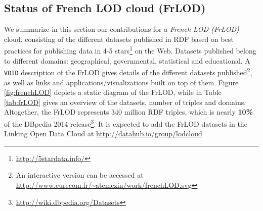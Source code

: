 \subsection{Status of French LOD cloud (FrLOD) }
\label{sec:frenchCloud}
We summarize in this section our contributions for a \textit{French LOD (FrLOD)} cloud, consisting of the different datasets published in RDF based on best practices for publishing data in 4-5 stars\footnote{\url{http://5stardata.info/}} on the Web. Datasets published belong to different domains: geographical, governmental, statistical and educational. A \texttt{VOID} \cite{alexander09} description of the FrLOD gives details of the different datasets published\footnote{An interactive version can be accessed at \url{http://www.eurecom.fr/~atemezin/work/frenchLOD.svg}}, as well as links and applications/visualizations built on top of them. Figure  \ref{fig:frenchLOD} depicts a static diagram of the FrLOD, while in Table \ref{tab:frLOD} gives an overview of the datasets, number of triples and domains. Altogether, the FrLOD represents 340 million RDF triples, which is nearly \textbf{10\%} of the DBpedia 2014 release\footnote{\url{http://wiki.dbpedia.org/Datasets}}. It is expected to add the FrLOD datasets in the Linking Open Data Cloud at \url{http://datahub.io/group/lodcloud}

\begin{figure}[h!tb]
\end{figure}

